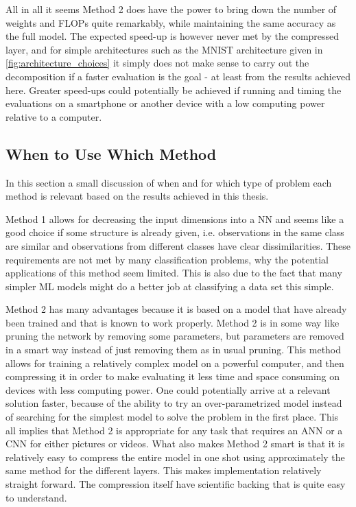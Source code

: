 All in all it seems Method 2 does have the power to bring down the number of weights and FLOPs quite remarkably, while maintaining the same accuracy as the full model. The expected speed-up is however never met by the compressed layer, and for simple architectures such as the MNIST architecture given in \autoref{fig:architecture_choices} it simply does not make sense to carry out the decomposition if a faster evaluation is the goal - at least from the results achieved here. Greater speed-ups could potentially be achieved if running and timing the evaluations on a smartphone or another device with a low computing power relative to a computer.

\subsection{When to Use Which Method}
In this section a small discussion of when and for which type of problem each method is relevant based on the results achieved in this thesis.

Method 1 allows for decreasing the input dimensions into a NN and seems like a good choice if some structure is already given, i.e. observations in the same class are similar and observations from different classes have clear dissimilarities. These requirements are not met by many classification problems, why the potential applications of this method seem limited. This is also due to the fact that many simpler ML models might do a better job at classifying a data set this simple.

Method 2 has many advantages because it is based on a model that have already been trained and that is known to work properly. Method 2 is in some way like pruning the network by removing some parameters, but parameters are removed in a smart way instead of just removing them as in usual pruning. This method allows for training a relatively complex model on a powerful computer, and then compressing it in order to make evaluating it less time and space consuming on devices with less computing power. One could potentially arrive at a relevant solution faster, because of the ability to try an over-parametrized model instead of searching for the simplest model to solve the problem in the first place. This all implies that Method 2 is appropriate for any task that requires an ANN or a CNN for either pictures or videos. What also makes Method 2 smart is that it is relatively easy to compress the entire model in one shot using approximately the same method for the different layers. This makes implementation relatively straight forward. The compression itself have scientific backing that is quite easy to understand. 

